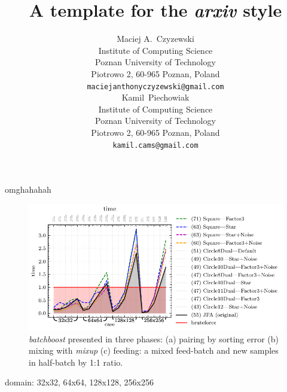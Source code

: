 \documentclass{article}
\title{A template for the \emph{arxiv} style}
\author{
  Maciej A.~Czyzewski\\
  Institute of Computing Science\\
  Poznan University of Technology\\
  Piotrowo 2, 60-965 Poznan, Poland\\
  \texttt{maciejanthonyczyzewski@gmail.com} \\
  \And
  Kamil~Piechowiak\\
  Institute of Computing Science\\
  Poznan University of Technology\\
  Piotrowo 2, 60-965 Poznan, Poland\\
  \texttt{kamil.cams@gmail.com} \\
}
\begin{document}

\maketitle

\begin{abstract}
	\lipsum[1]
\end{abstract}



omghahahah

\begin{figure}[H]
	\centering
	\includegraphics[width=\linewidth]{../figures/figure-1-time}
	\caption{\emph{batchboost} presented in three phases: (a) pairing by sorting
	  error (b) mixing with \emph{mixup} (c) feeding: a mixed feed-batch and new
	  samples in half-batch by 1:1 ratio.}
	\label{fig:abstract}
\end{figure}

\begin{table}
	\centering
	
	\newline
	\caption{domain: 32x32, 64x64, 128x128, 256x256}
\end{table}



 
\end{document}
